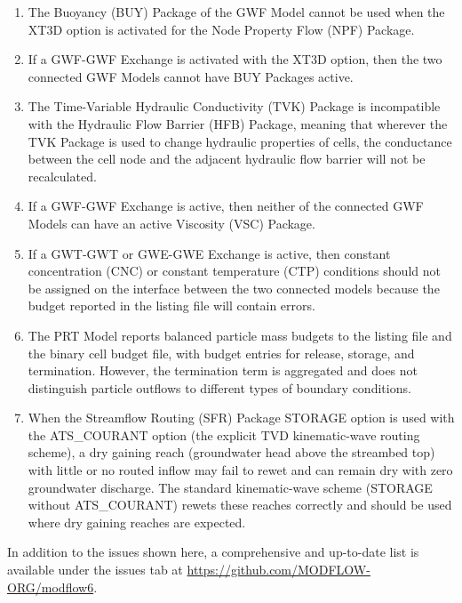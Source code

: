 \documentclass[11pt,twoside,twocolumn]{usgsreport}
\begin{document}
\begin{enumerate}
\item
The Buoyancy (BUY) Package of the GWF Model cannot be used when the XT3D option is activated for the Node Property Flow (NPF) Package.

\item
If a GWF-GWF Exchange is activated with the XT3D option, then the two connected GWF Models cannot have BUY Packages active.

\item
The Time-Variable Hydraulic Conductivity (TVK) Package is incompatible with the Hydraulic Flow Barrier (HFB) Package, meaning that wherever the TVK Package is used to change hydraulic properties of cells, the conductance between the cell node and the adjacent hydraulic flow barrier will not be recalculated.

\item
If a GWF-GWF Exchange is active, then neither of the connected GWF Models can have an active Viscosity (VSC) Package.

\item 
If a GWT-GWT or GWE-GWE Exchange is active, then constant concentration (CNC) or constant temperature (CTP) conditions should not be assigned on the interface between the two connected models because the budget reported in the listing file will contain errors.  

\item
The PRT Model reports balanced particle mass budgets to the listing file and the binary cell budget file, with budget entries for release, storage, and termination. However, the termination term is aggregated and does not distinguish particle outflows to different types of boundary conditions.

\item
When the Streamflow Routing (SFR) Package STORAGE option is used with the ATS\_COURANT option (the explicit TVD kinematic-wave routing scheme), a dry gaining reach (groundwater head above the streambed top) with little or no routed inflow may fail to rewet and can remain dry with zero groundwater discharge. The standard kinematic-wave scheme (STORAGE without ATS\_COURANT) rewets these reaches correctly and should be used where dry gaining reaches are expected.

\end{enumerate}

In addition to the issues shown here, a comprehensive and up-to-date list is available under the issues tab at \url{https://github.com/MODFLOW-ORG/modflow6}.
\end{document}

